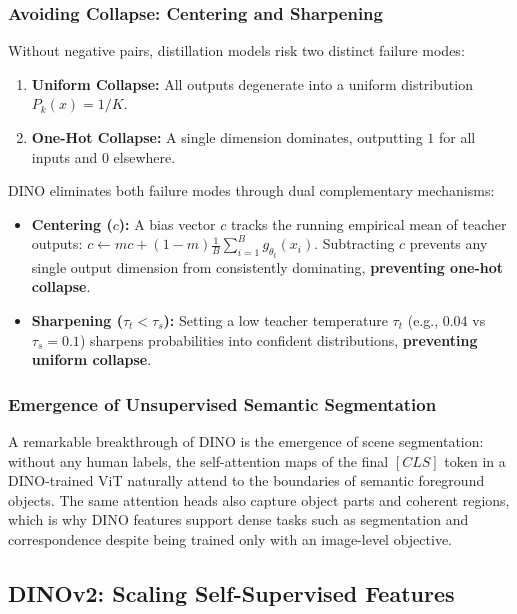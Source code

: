 \subsubsection{Avoiding Collapse: Centering and Sharpening}
Without negative pairs, distillation models risk two distinct failure modes:
\begin{enumerate}[leftmargin=*]
    \item \textbf{Uniform Collapse:} All outputs degenerate into a uniform distribution $P_k(x) = 1/K$.
    \item \textbf{One-Hot Collapse:} A single dimension dominates, outputting $1$ for all inputs and $0$ elsewhere.
\end{enumerate}

DINO eliminates both failure modes through dual complementary mechanisms:
\begin{itemize}[leftmargin=*]
    \item \textbf{Centering ($c$):} A bias vector $c$ tracks the running empirical mean of teacher outputs: $c \leftarrow m c + (1 - m) \frac{1}{B} \sum_{i=1}^B g_{\theta_t}(x_i)$. Subtracting $c$ prevents any single output dimension from consistently dominating, \textbf{preventing one-hot collapse}.
    \item \textbf{Sharpening ($\tau_t < \tau_s$):} Setting a low teacher temperature $\tau_t$ (e.g., $0.04$ vs $\tau_s = 0.1$) sharpens probabilities into confident distributions, \textbf{preventing uniform collapse}.
\end{itemize}

\subsubsection{Emergence of Unsupervised Semantic Segmentation}
A remarkable breakthrough of DINO is the emergence of scene segmentation: without any human labels, the self-attention maps of the final $[CLS]$ token in a DINO-trained ViT naturally attend to the boundaries of semantic foreground objects. The same attention heads also capture object parts and coherent regions, which is why DINO features support dense tasks such as segmentation and correspondence despite being trained only with an image-level objective.

\subsection{\texorpdfstring{DINOv2:}{DINOv2:} Scaling Self-Supervised Features}

